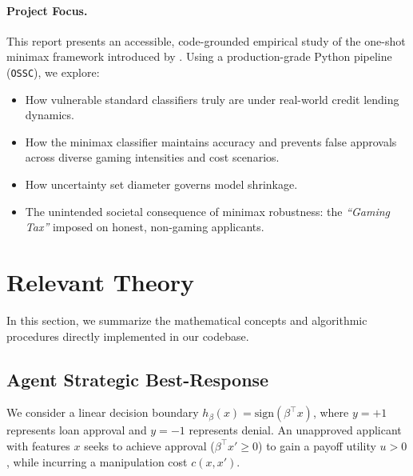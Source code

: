 \documentclass[10pt, letterpaper]{article}
\newcommand{\sign}{\text{sign}}
\begin{document}
\paragraph{Project Focus.} This report presents an accessible, code-grounded empirical study of the one-shot minimax framework introduced by \citet{rosenfeld2024oneshot}. Using a production-grade Python pipeline (\texttt{OSSC}), we explore:
\begin{itemize}[leftmargin=*]
    \item How vulnerable standard classifiers truly are under real-world credit lending dynamics.
    \item How the minimax classifier maintains accuracy and prevents false approvals across diverse gaming intensities and cost scenarios.
    \item How uncertainty set diameter governs model shrinkage.
    \item The unintended societal consequence of minimax robustness: the \emph{``Gaming Tax''} imposed on honest, non-gaming applicants.
\end{itemize}

\section{Relevant Theory}
\label{sec:theory}

In this section, we summarize the mathematical concepts and algorithmic procedures directly implemented in our codebase.

\subsection{Agent Strategic Best-Response}
We consider a linear decision boundary $h_\beta(x) = \sign(\beta^\top x)$, where $y = +1$ represents loan approval and $y = -1$ represents denial. An unapproved applicant with features $x$ seeks to achieve approval ($\beta^\top x' \ge 0$) to gain a payoff utility $u > 0$, while incurring a manipulation cost $c(x, x')$.
\end{document}
